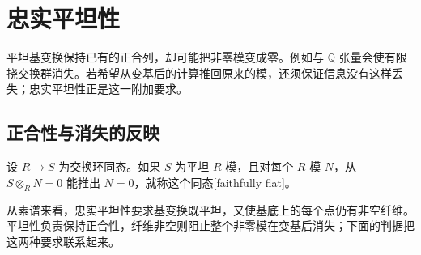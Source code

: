 
\section{忠实平坦性}
\label{b3:sec:1205}

平坦基变换保持已有的正合列，却可能把非零模变成零。例如与 \(\mathbb Q\) 张量会使有限挠交换群消失。若希望从变基后的计算推回原来的模，还须保证信息没有这样丢失；忠实平坦性正是这一附加要求。


\subsection{正合性与消失的反映}
\label{b3:subsec:1205:01}

\begin{definition}\label{b3:def:faithfully-flat}
	设 \(R\to S\) 为交换环同态。如果 \(S\) 为平坦 \(R\) 模，且对每个 \(R\) 模 \(N\)，从 \(S\otimes_RN=0\) 能推出 \(N=0\)，就称这个同态[faithfully flat]。
\end{definition}

从素谱来看，忠实平坦性要求基变换既平坦，又使基底上的每个点仍有非空纤维。平坦性负责保持正合性，纤维非空则阻止整个非零模在变基后消失；下面的判据把这两种要求联系起来。

